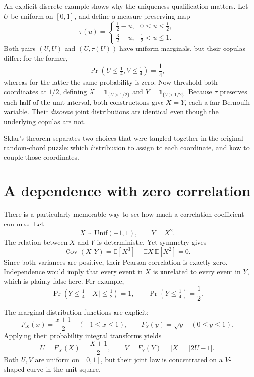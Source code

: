 An explicit discrete example shows why the uniqueness qualification matters. Let \(U\) be uniform on \([0,1]\), and define a measure-preserving map
\[
 \tau(u)=
 \begin{cases}
 \frac12-u,&0\leq u\leq\frac12,\\[2pt]
 \frac32-u,&\frac12<u\leq1.
 \end{cases}
\]
Both pairs \((U,U)\) and \((U,\tau(U))\) have uniform marginals, but their copulas differ: for the former,
\[
 \Pr(U\leq\tfrac14,V\leq\tfrac14)=\frac14,
\]
whereas for the latter the same probability is zero. Now threshold both coordinates at \(1/2\), defining \(X=\mathbf1_{\{U>1/2\}}\) and \(Y=\mathbf1_{\{V>1/2\}}\). Because \(\tau\) preserves each half of the unit interval, both constructions give \(X=Y\), each a fair Bernoulli variable. Their \emph{discrete} joint distributions are identical even though the underlying copulas are not.

Sklar's theorem separates two choices that were tangled together in the original random-chord puzzle: which distribution to assign to each coordinate, and how to couple those coordinates.

\section{A dependence with zero correlation}

There is a particularly memorable way to see how much a correlation coefficient can miss. Let
\[
 X\sim\mathrm{Unif}(-1,1),\qquad Y=X^2.
\]
The relation between \(X\) and \(Y\) is deterministic. Yet symmetry gives
\[
 \operatorname{Cov}(X,Y)
 =\mathbb E[X^3]-\mathbb EX\,\mathbb E[X^2]=0.
\]
Since both variances are positive, their Pearson correlation is exactly zero. Independence would imply that every event in \(X\) is unrelated to every event in \(Y\), which is plainly false here. For example,
\[
 \Pr(Y\leq\tfrac14\mid |X|\leq\tfrac12)=1,
 \qquad
 \Pr(Y\leq\tfrac14)=\frac12.
\]

The marginal distribution functions are explicit:
\[
 F_X(x)=\frac{x+1}{2}\quad(-1\leq x\leq1),
 \qquad
 F_Y(y)=\sqrt y\quad(0\leq y\leq1).
\]
Applying their probability integral transforms yields
\begin{equation}
 U=F_X(X)=\frac{X+1}{2},\qquad
 V=F_Y(Y)=|X|=|2U-1|.
 \label{eq:N20261105-Vshape}
\end{equation}
Both \(U,V\) are uniform on \([0,1]\), but their joint law is concentrated on a \(V\)-shaped curve in the unit square.

